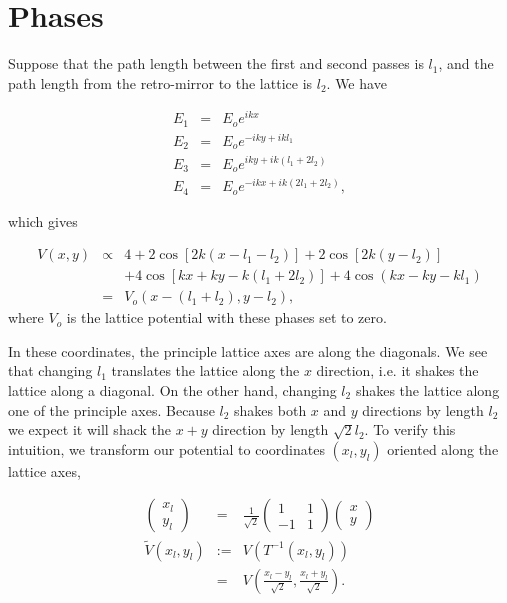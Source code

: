 \documentclass{article}
\theoremstyle{definition}
\begin{document}
\section{Phases}

Suppose that the path length between the first and second passes is $l_1$, and the path length from the retro-mirror to the lattice is $l_2$. We have

\begin{eqnarray}
  E_1 &=& E_o e^{ikx} \\
  E_2 &=& E_o e^{-iky + ikl_1}\\
  E_3 &=& E_o e^{iky + ik(l_1 + 2l_2)}\\
  E_4 &=& E_o e^{-ikx + ik(2l_1 + 2l_2)},
\end{eqnarray}

which gives

\begin{eqnarray}
V(x,y) &\propto& 4 + 2 \cos[2k(x - l_1 - l_2)] + 2 \cos[2k(y-l_2)] \\
&& + 4 \cos[kx + ky - k(l_1 + 2 l_2)] + 4 \cos(kx - ky - kl_1) \\
&=& V_o(x - (l_1 + l_2), y - l_2), \label{eq:latt-shaking}
\end{eqnarray}
where $V_o$ is the lattice potential with these phases set to zero.

In these coordinates, the principle lattice axes are along the diagonals. We see that changing $l_1$ translates the lattice along the $x$ direction, i.e. it shakes the lattice along a diagonal. On the other hand, changing $l_2$ shakes the lattice along one of the principle axes. Because $l_2$ shakes both $x$ and $y$ directions by length $l_2$ we expect it will shack the $x+y$ direction by length $\sqrt{2} l_2$. To verify this intuition, we transform our potential to coordinates $(x_l, y_l)$ oriented along the lattice axes,

\begin{eqnarray}
\begin{pmatrix}
x_l \\
y_l
\end{pmatrix}
&=&
\frac{1}{\sqrt{2}}
\begin{pmatrix}
1 & 1\\
-1 & 1
\end{pmatrix}
\begin{pmatrix}
x \\
y
\end{pmatrix}\\
\tilde{V}(x_l, y_l) &:=& V(T^{-1}(x_l, y_l))\\
&=& V \left(\frac{x_l - y_l}{\sqrt{2}}, \frac{x_l + y_l}{\sqrt{2}} \right).
\end{eqnarray}
\end{document}
